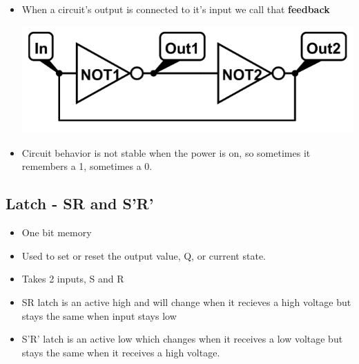 \documentclass{article}
\begin{document}
\begin{itemize}
    \item When a circuit's output is connected to it's input we call that \textbf{feedback}
    
    \includegraphics[scale=0.35]{images/feedback.png}
    
    \item Circuit behavior is not stable when the power is on, so sometimes it remembers a 1, sometimes a 0.
    

\end{itemize}

\subsection{Latch - SR and S'R'}

\begin{itemize}
    \item One bit memory
    
    \item Used to set or reset the output value, Q, or current state. 
    
    \item Takes 2 inputs, S and R
    
    \item SR latch is an active high and will change when it recieves a high voltage but stays the same when input stays low
    
    \item S'R' latch is an active low which changes when it receives a low voltage but stays the same when it receives a high voltage.
\end{itemize}
\end{document}
